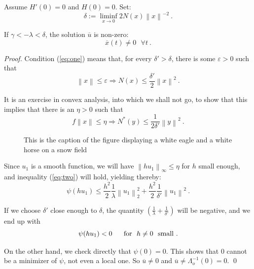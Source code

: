 \documentclass{svproc}
\begin{document}
%
\begin{proposition}
Assume $H'(0)=0$ and $ H(0)=0$. Set:
\begin{equation}
  \delta := \liminf_{x\to 0} 2 N (x) \left\|x\right\|^{-2}\ .
  \label{eq:one}
\end{equation}

If $\gamma < - \lambda < \delta$,
the solution $\overline{u}$ is non-zero:
\begin{equation}
  \overline{x} (t) \ne 0\ \ \ \forall t\ .
\end{equation}
\end{proposition}
%
\begin{proof}
Condition (\ref{eq:one}) means that, for every
$\delta ' > \delta$, there is some $\varepsilon > 0$ such that
\begin{equation}
  \left\|x\right\| \le \varepsilon \Rightarrow N (x) \le
  \frac{\delta '}{2} \left\|x\right\|^{2}\ .
\end{equation}

It is an exercise in convex analysis, into which we shall not go, to
show that this implies that there is an $\eta > 0$ such that
\begin{equation}
  f\left\|x\right\| \le \eta
  \Rightarrow N^{\ast} (y) \le \frac{1}{2\delta '}
  \left\|y\right\|^{2}\ .
  \label{eq:two}
\end{equation}

\begin{figure}
\vspace{2.5cm}
\caption{This is the caption of the figure displaying a white eagle and
a white horse on a snow field}
\end{figure}

Since $u_{1}$ is a smooth function, we will have
$\left\|hu_{1}\right\|_\infty \le \eta$
for $h$ small enough, and inequality (\ref{eq:two}) will hold,
yielding thereby:
\begin{equation}
  \psi (hu_{1}) \le \frac{h^{2}}{2}
  \frac{1}{\lambda} \left\|u_{1} \right\|_{2}^{2} + \frac{h^{2}}{2}
  \frac{1}{\delta '} \left\|u_{1}\right\|^{2}\ .
\end{equation}

If we choose $\delta '$ close enough to $\delta$, the quantity
$\left(\frac{1}{\lambda} + \frac{1}{\delta '}\right)$
will be negative, and we end up with
\begin{equation}
  \psi (hu_{1}) < 0\ \ \ \ \ {\rm for}\ \ h\ne 0\ \ {\rm small}\ .
\end{equation}

On the other hand, we check directly that $\psi (0) = 0$. This shows
that 0 cannot be a minimizer of $\psi$, not even a local one.
So $\overline{u} \ne 0$ and
$\overline{u} \ne \Lambda_{o}^{-1} (0) = 0$. \qed
\end{proof}
\end{document}
